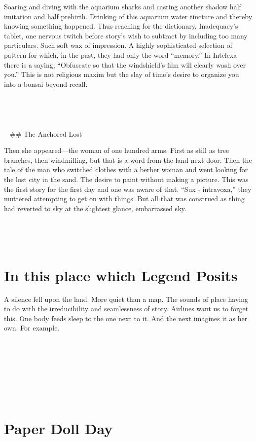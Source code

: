 \documentclass[
]{memoir}
\begin{document}
Soaring and diving with the aquarium sharks and casting another shadow
half imitation and half prebirth. Drinking of this aquarium water
tincture and thereby knowing something happened. Thus reaching for the
dictionary. Inadequacy's tablet, one nervous twitch before story's wish
to subtract by including too many particulars. Such soft wax of
impression. A highly sophisticated selection of pattern for which, in
the past, they had only the word ``memory.'' In Intelexa there is a
saying, ``Obfuscate so that the windshield's film will clearly wash over
you.'' This is not religious maxim but the slay of time's desire to
organize you into a bonsai beyond recall.

~

~

~ \#\# The Anchored Lost

Then she appeared---the woman of one hundred arms. First as still as
tree branches, then windmilling, but that is a word from the land next
door. Then the tale of the man who switched clothes with a berber woman
and went looking for the lost city in the sand. The desire to paint
without making a picture. This was the first story for the first day and
one was aware of that. ``Sux - intravoxa,'' they muttered attempting to
get on with things. But all that was construed as thing had reverted to
sky at the slightest glance, embarrassed sky.

~

~

\hypertarget{in-this-place-which-legend-posits}{%
\section*{In this place which Legend
Posits}\label{in-this-place-which-legend-posits}}

A silence fell upon the land. More quiet than a map. The sounds of place
having to do with the irreducibility and seamlessness of story. Airlines
want us to forget this. One body feeds sleep to the one next to it. And
the next imagines it as her own. For example.

~

~

~

~

\hypertarget{paper-doll-day}{%
\section*{Paper Doll Day}\label{paper-doll-day}}
\end{document}

